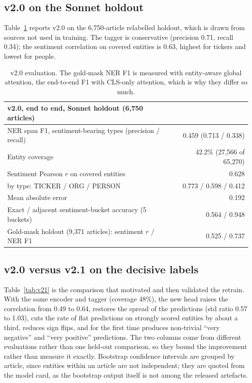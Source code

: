 \documentclass[11pt,letterpaper]{article}
\begin{document}
\subsection{v2.0 on the Sonnet holdout}

Table~\ref{tab:v20} reports v2.0 on the 6{,}750-article relabelled holdout, which is drawn from
sources not used in training. The tagger is conservative (precision 0.71, recall 0.34); the
sentiment correlation on covered entities is 0.63, highest for tickers and lowest for people.

\begin{table}[H]
\centering\small
\begin{tabular}{@{}lr@{}}
\toprule
\textbf{v2.0, end to end, Sonnet holdout (6{,}750 articles)} & \\
\midrule
NER span F1, sentiment-bearing types (precision / recall) & 0.459 (0.713 / 0.338) \\
Entity coverage & 42.2\% (27{,}566 of 65{,}270) \\
Sentiment Pearson $r$ on covered entities & 0.628 \\
\quad by type: TICKER / ORG / PERSON & 0.773 / 0.598 / 0.412 \\
Mean absolute error & 0.192 \\
Exact / adjacent sentiment-bucket accuracy (5 buckets) & 0.564 / 0.948 \\
\midrule
Gold-mask holdout (9{,}371 articles): sentiment $r$ / NER F1 & 0.525 / 0.737 \\
\bottomrule
\end{tabular}
\caption{v2.0 evaluation. The gold-mask NER F1 is measured with entity-aware global attention,
the end-to-end F1 with CLS-only attention, which is why they differ so much.}
\label{tab:v20}
\end{table}

\subsection{v2.0 versus v2.1 on the decisive labels}

Table~\ref{tab:v21} is the comparison that motivated and then validated the retrain. With the
same encoder and tagger (coverage 48\%), the new head raises the correlation from 0.49 to 0.64,
restores the spread of the predictions (std ratio 0.57 to 1.03), cuts the rate of flat
predictions on strongly scored entities by about a third, reduces sign flips, and for the first
time produces non-trivial ``very negative'' and ``very positive'' predictions. The two columns come
from different evaluations rather than one held-out comparison, so they bound the improvement
rather than measure it exactly. Bootstrap confidence intervals are grouped by article, since
entities within an article are not independent; they are quoted from the model card, as the
bootstrap output itself is not among the released artefacts.
\end{document}
